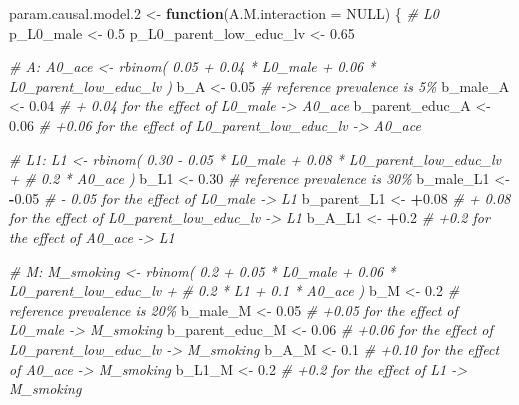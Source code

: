 \documentclass[
]{book}
\newenvironment{Shaded}{\begin{snugshade}}{\end{snugshade}}
\newcommand{\AttributeTok}[1]{\textcolor[rgb]{0.13,0.29,0.53}{#1}}
\newcommand{\CommentTok}[1]{\textcolor[rgb]{0.56,0.35,0.01}{\textit{#1}}}
\newcommand{\ConstantTok}[1]{\textcolor[rgb]{0.56,0.35,0.01}{#1}}
\newcommand{\ControlFlowTok}[1]{\textcolor[rgb]{0.13,0.29,0.53}{\textbf{#1}}}
\newcommand{\FloatTok}[1]{\textcolor[rgb]{0.00,0.00,0.81}{#1}}
\newcommand{\NormalTok}[1]{#1}
\newcommand{\OtherTok}[1]{\textcolor[rgb]{0.56,0.35,0.01}{#1}}
\newcommand{\SpecialCharTok}[1]{\textcolor[rgb]{0.81,0.36,0.00}{\textbf{#1}}}
\begin{document}
\begin{Shaded}
\begin{Highlighting}[]
\NormalTok{param.causal.model}\FloatTok{.2} \OtherTok{\textless{}{-}} \ControlFlowTok{function}\NormalTok{(}\AttributeTok{A.M.interaction =} \ConstantTok{NULL}\NormalTok{) \{}
\CommentTok{\# L0}
\NormalTok{p\_L0\_male }\OtherTok{\textless{}{-}} \FloatTok{0.5}
\NormalTok{p\_L0\_parent\_low\_educ\_lv }\OtherTok{\textless{}{-}} \FloatTok{0.65}

\CommentTok{\# A: A0\_ace \textless{}{-} rbinom( 0.05 + 0.04 * L0\_male + 0.06 * L0\_parent\_low\_educ\_lv ) }
\NormalTok{b\_A }\OtherTok{\textless{}{-}} \FloatTok{0.05}   \CommentTok{\# reference prevalence is 5\%}
\NormalTok{b\_male\_A }\OtherTok{\textless{}{-}} \FloatTok{0.04}  \CommentTok{\# + 0.04 for the effect of L0\_male {-}\textgreater{} A0\_ace}
\NormalTok{b\_parent\_educ\_A }\OtherTok{\textless{}{-}} \FloatTok{0.06}  \CommentTok{\# +0.06 for the effect of L0\_parent\_low\_educ\_lv {-}\textgreater{} A0\_ace}

\CommentTok{\# L1: L1 \textless{}{-} rbinom( 0.30 {-} 0.05 * L0\_male + 0.08 * L0\_parent\_low\_educ\_lv + }
\CommentTok{\#                   0.2 * A0\_ace ) }
\NormalTok{b\_L1 }\OtherTok{\textless{}{-}} \FloatTok{0.30}   \CommentTok{\# reference prevalence is 30\%}
\NormalTok{b\_male\_L1 }\OtherTok{\textless{}{-}} \SpecialCharTok{{-}}\FloatTok{0.05}  \CommentTok{\# {-} 0.05 for the effect of L0\_male {-}\textgreater{} L1}
\NormalTok{b\_parent\_L1 }\OtherTok{\textless{}{-}} \SpecialCharTok{+}\FloatTok{0.08} \CommentTok{\# + 0.08 for the effect of L0\_parent\_low\_educ\_lv {-}\textgreater{} L1}
\NormalTok{b\_A\_L1 }\OtherTok{\textless{}{-}} \SpecialCharTok{+}\FloatTok{0.2} \CommentTok{\# +0.2 for the effect of A0\_ace {-}\textgreater{} L1}

\CommentTok{\# M: M\_smoking \textless{}{-} rbinom( 0.2 + 0.05 * L0\_male + 0.06 * L0\_parent\_low\_educ\_lv + }
\CommentTok{\#                         0.2 * L1 + 0.1 * A0\_ace ) }
\NormalTok{b\_M }\OtherTok{\textless{}{-}} \FloatTok{0.2} \CommentTok{\# reference prevalence is 20\%}
\NormalTok{b\_male\_M }\OtherTok{\textless{}{-}} \FloatTok{0.05} \CommentTok{\# +0.05 for the effect of L0\_male {-}\textgreater{} M\_smoking}
\NormalTok{b\_parent\_educ\_M }\OtherTok{\textless{}{-}} \FloatTok{0.06} \CommentTok{\# +0.06 for the effect of L0\_parent\_low\_educ\_lv {-}\textgreater{} M\_smoking}
\NormalTok{b\_A\_M }\OtherTok{\textless{}{-}} \FloatTok{0.1} \CommentTok{\# +0.10 for the effect of A0\_ace {-}\textgreater{} M\_smoking}
\NormalTok{b\_L1\_M }\OtherTok{\textless{}{-}} \FloatTok{0.2} \CommentTok{\# +0.2 for the effect of L1 {-}\textgreater{} M\_smoking}


\end{Highlighting}
\end{Shaded}
\end{document}
